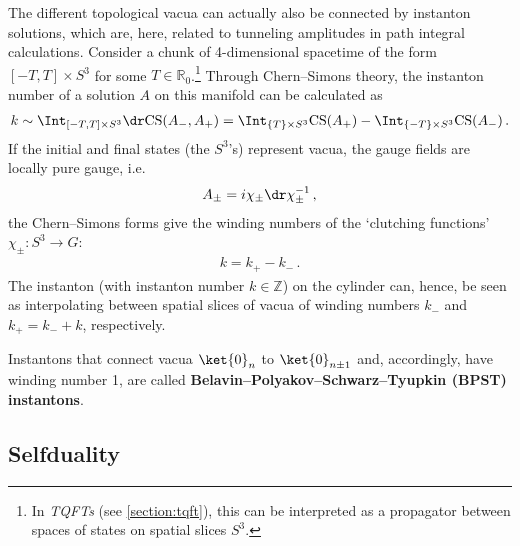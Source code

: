     The different topological vacua can actually also be connected by instanton solutions, which are, here, related to tunneling amplitudes in path integral calculations. Consider a chunk of 4-dimensional spacetime of the form $[-T,T]\times S^3$ for some $T\in\mathbb{R}_0$.\footnote{In \textit{TQFTs} (see \cref{section:tqft}), this can be interpreted as a propagator between spaces of states on spatial slices $S^3$.} Through Chern--Simons theory, the instanton number of a solution $A$ on this manifold can be calculated as
    \begin{gather}
        k \sim \Int_{[-T,T]\times S^3}\dr\mathrm{CS}(A_-,A_+) = \Int_{\{T\}\times S^3}\mathrm{CS}(A_+)-\Int_{\{-T\}\times S^3}\mathrm{CS}(A_-)\,.
    \end{gather}
    If the initial and final states (the $S^3$'s) represent vacua, the gauge fields are locally pure gauge, i.e.
    \begin{gather}
        A_\pm = i\chi_\pm\dr\chi_\pm^{-1}\,,
    \end{gather}
    the Chern--Simons forms give the winding numbers of the `clutching functions' $\chi_\pm:S^3\rightarrow G$:
    \begin{gather}
        k = k_+-k_-\,.
    \end{gather}
    The instanton (with instanton number $k\in\mathbb{Z}$) on the cylinder can, hence, be seen as interpolating between spatial slices of vacua of winding numbers $k_-$ and $k_+=k_-+k$, respectively.
    
    \begin{example}
        Instantons that connect vacua $\ket{0}_n$ to $\ket{0}_{n\pm1}$ and, accordingly, have winding number 1, are called \textbf{Belavin--Polyakov--Schwarz--Tyupkin (BPST) instantons}.
    \end{example}


\subsection{Selfduality}

